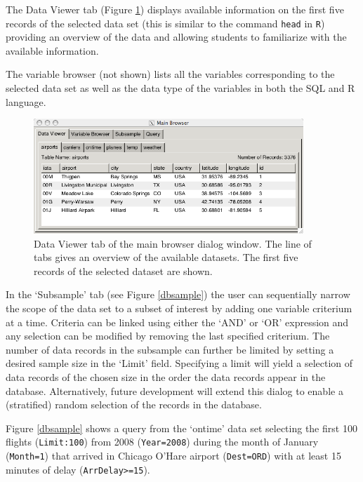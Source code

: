 \documentclass[11pt]{tise_style}
\begin{document}
The Data Viewer tab  (Figure \ref{lineviewer}) displays available information on the first five records of the selected data set (this is similar to the command {\tt head} in {\tt R}) providing an overview of the data and allowing students to familiarize with the available information.  

The variable browser (not shown) lists all the variables corresponding to the selected data set as well as the data type of the variables in both the SQL and R language.  


\begin{figure}[h] %
   \centering
   \includegraphics[width=4in]{db-lineviewer.png} 
   \caption{Data Viewer tab of the main browser dialog window. The line of tabs gives an overview of the available datasets. The first five records of the selected  dataset are shown.}
   \label{lineviewer}
\end{figure}

In the `Subsample' tab (see Figure \ref{dbsample}) the user can sequentially narrow the scope of the data set to a subset of interest by adding one variable criterium at a time. Criteria can be linked using either the `AND' or `OR' expression and any selection can be modified by removing the last specified criterium. The number of data records in the subsample can further be limited by setting a desired sample size  in the  `Limit' field. Specifying a limit will yield a selection of data records of the chosen size in the order the data records appear in the database. Alternatively, future development will extend this dialog to enable a (stratified) random selection of the records in the database.

Figure \ref{dbsample} shows a query from the `ontime' data set selecting the first 100 flights ({\tt{Limit:100}}) from 2008 ({\tt{Year=2008}}) during the month of January ({\tt{Month=1}}) that arrived in Chicago O'Hare airport ({\tt{Dest=ORD}}) with at least 15 minutes of delay ({\tt{ArrDelay>=15}}).  \\[.25cm]
\end{document}
